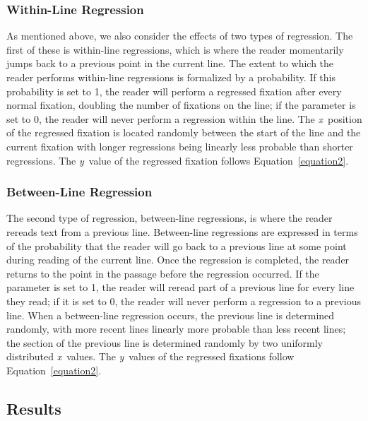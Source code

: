 \documentclass[doc,biblatex]{apa7}
\begin{document}
\subsubsection{Within-Line Regression}

As mentioned above, we also consider the effects of two types of regression. The first of these is within-line regressions, which is where the reader momentarily jumps back to a previous point in the current line. The extent to which the reader performs within-line regressions is formalized by a probability. If this probability is set to 1, the reader will perform a regressed fixation after every normal fixation, doubling the number of fixations on the line; if the parameter is set to 0, the reader will never perform a regression within the line. The \textit{x}~position of the regressed fixation is located randomly between the start of the line and the current fixation with longer regressions being linearly less probable than shorter regressions. The \textit{y}~value of the regressed fixation follows Equation~\ref{equation2}.

\subsubsection{Between-Line Regression}

The second type of regression, between-line regressions, is where the reader rereads text from a previous line. Between-line regressions are expressed in terms of the probability that the reader will go back to a previous line at some point during reading of the current line. Once the regression is completed, the reader returns to the point in the passage before the regression occurred. If the parameter is set to 1, the reader will reread part of a previous line for every line they read; if it is set to 0, the reader will never perform a regression to a previous line. When a between-line regression occurs, the previous line is determined randomly, with more recent lines linearly more probable than less recent lines; the section of the previous line is determined randomly by two uniformly distributed \textit{x}~values. The \textit{y}~values of the regressed fixations follow Equation~\ref{equation2}.

\subsection{Results}
\end{document}
